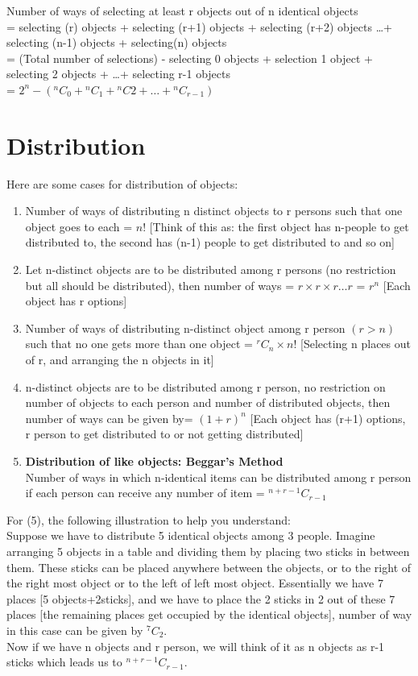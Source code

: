 \documentclass[12pt, a4paper]{article}
\begin{document}
    Number of ways of selecting at least r objects out of n identical objects\\
        = selecting (r) objects + selecting (r+1) objects + selecting (r+2) objects \dots  + selecting (n-1) objects + selecting(n) objects\\
    = (Total number of selections) - selecting 0 objects + selection 1 object + selecting 2 objects + \dots + selecting r-1 objects\\
    = $2^n - ({^nC_0}+{^nC_1}+{^nC2}+\dots+{^nC_{r-1}})$
    
\section{Distribution}
Here are some cases for distribution of objects:
\begin{enumerate}
    \item Number of ways of distributing n distinct objects to r persons such that one object goes to each = $n!$ [Think of this as: the first object has n-people to get distributed to, the second has (n-1) people to get distributed to and so on]
    \item Let n-distinct objects are to be distributed among r persons (no restriction but all should be distributed), then number of ways = $r\times r \times r \dots r$ = $r^n$ [Each object has r options]
    \item Number of ways of distributing n-distinct object among r person $(r>n)$ such that no one gets more than one object = ${^rC_n}\times n!$ [Selecting n places out of r, and arranging the n objects in it]
    \item n-distinct objects are to be distributed among r person, no restriction on number of objects to each person and number of distributed objects, then number of ways can be given by= ${(1+r)^n}$ [Each object has (r+1) options, r person to get distributed to or not getting distributed]
    \item \textbf{Distribution of like objects: Beggar's Method}\\ Number of ways in which n-identical items can be distributed among r person if each person can receive any number of item = ${^{n+r-1}C_{r-1}}$
\end{enumerate}
For (5),  the following illustration to help you understand: \\

Suppose we have to distribute 5 identical objects among 3 people. Imagine arranging 5 objects in a table and dividing them by placing two sticks in between them. These sticks can be placed anywhere between the objects, or to the right of the right most object or to the left of left most object. Essentially we have 7 places [5 objects+2sticks], and we have to place the 2 sticks in 2 out of these 7 places [the remaining places get occupied by the identical objects], number of way in this case can be given by $^7C_2$. \\ Now if we have n objects and r person, we will think of it as n objects as r-1 sticks which leads us to ${^{n+r-1}C_{r-1}}$.
\end{document}
